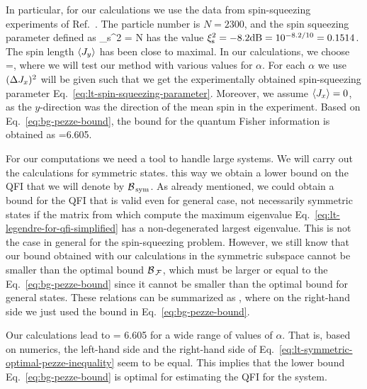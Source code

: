 In particular, for our calculations we use the data from spin-squeezing experiments of Ref.~\cite{Gross2010}.
The particle number is $N=2300$, and the spin squeezing parameter defined as
\be
  \label{eq:lt-spin-squeezing-parameter}
  \xi_{\textnormal{s}}^2 = N 
\ee
has the value $\xi_{\textnormal{s}}^2=-8.2\textnormal{dB}=10^{-8.2/10}=0.1514$.
The spin length $\langle{J_y}\rangle$ has been close to maximal.
In our calculations, we choose
\be
  =\alpha {},
\ee
where we will test our method with various values for $\alpha$.
For each $\alpha$ we use $(\Delta J_x )^2$ will be given such that we get the experimentally obtained spin-squeezing parameter Eq.~\eqref{eq:lt-spin-squeezing-parameter}.
Moreover, we assume $\langle{J_x}\rangle=0$, as the $y$-direction was the direction of the mean spin in the experiment.
Based on Eq.~\eqref{eq:bg-pezze-bound}, the bound for the quantum Fisher information is obtained as
\be
  \label{eq:lt-bound-for-experiment}
  \geqslant {}=6.605.
\ee

For our computations we need a tool to handle large systems.
We will carry out the calculations for symmetric states.
this way we obtain a lower bound on the QFI that we will denote by $\mathcal{B}_{\, \textnormal{sym} }$.
As already mentioned, we could obtain a bound for the QFI that is valid even for general case, not necessarily symmetric states if the matrix from which compute the maximum eigenvalue Eq.~\eqref{eq:lt-legendre-for-qfi-simplified} has a non-degenerated largest eigenvalue.
This is not the case in general for the spin-squeezing problem.
However, we still know that our bound obtained with our calculations in the symmetric subspace cannot be smaller than the optimal bound $\mathcal{B}_{\, \mathcal{F} }$, which must be larger or equal to the Eq.~\eqref{eq:bg-pezze-bound} since it cannot be smaller than the optimal bound for general states.
These relations can be summarized as
\be
  \geqslant {}\geqslant{},
\ee
where on the right-hand side we just used the bound in Eq.~\eqref{eq:bg-pezze-bound}.

Our calculations lead to
\be
  \label{eq:lt-symmetric-optimal-pezze-inequality}
   = 6.605
\ee
for a wide range of values of $\alpha$.
That is, based on numerics, the left-hand side and the right-hand side of Eq.~\eqref{eq:lt-symmetric-optimal-pezze-inequality} seem to be equal.
This implies that the lower bound Eq.~\eqref{eq:bg-pezze-bound} is optimal for estimating the QFI for the system.

